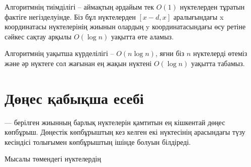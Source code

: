 {\begin{center}
\end{center}

Алгоритмнің тиімділігі -- аймақтың әрдайым
тек $O(1)$ нүктелерден тұратын
фактіге негізделуінде. Біз бұл нүктелерден $[x-d,x]$ аралығындағы x координатасы нүктелерінің жиынын олардың y координатасындағы өсу ретіне сәйкес сақтау арқылы $O(\log n)$ уақытта өте аламыз.
 

Алгоритмнің уақытша күрделілігі -- $O(n \log n)$, яғни
біз $n$ нүктелерді өтеміз және 
әр нүктеге сол жағынан ең жақын нүктені $O(\log n)$ уақытта
табамыз. 


\section{Дөңес қабықша есебі}

 –– берілген жиынның барлық нүктелерін 
қамтитын ең кішкентай дөңес көпбұрыш. Дөңестік 
көпбұрыштың кез келген екі нүктесінің арасындағы 
түзу кесіндісі толығымен көпбұрыштың ішінде болуын білдіреді.


\begin{samepage}
Мысалы төмендегі нүктелердің
\begin{center}
\end{center}
\end{samepage}}
